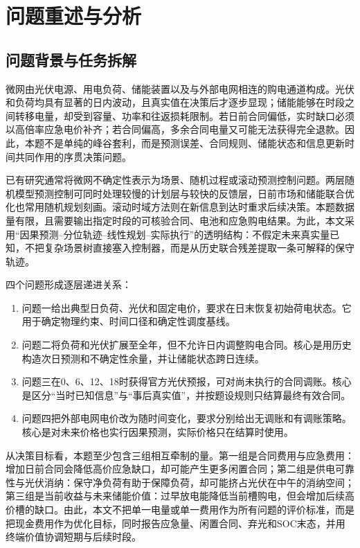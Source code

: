 \section{问题重述与分析}

\subsection{问题背景与任务拆解}

微网由光伏电源、用电负荷、储能装置以及与外部电网相连的购电通道构成。光伏和负荷均具有显著的日内波动，且真实值在决策后才逐步显现；储能能够在时段之间转移电量，却受到容量、功率和往返损耗限制。若日前合同偏低，实时缺口必须以高倍率应急电价补齐；若合同偏高，多余合同电量又可能无法获得完全退款。因此，本题不是单纯的峰谷套利，而是预测误差、合同规则、储能状态和信息更新时间共同作用的序贯决策问题。

已有研究通常将微网不确定性表示为场景、随机过程或滚动预测控制问题\cite{liang2014survey,hu2021mpc}。两层随机模型预测控制可同时处理较慢的计划层与较快的反馈层\cite{raimondi2018twolayer}，日前市场和储能联合优化也常用随机规划刻画\cite{zhao2020dayahead}。滚动时域方法则在新信息到达时重求后续决策\cite{silvente2015rolling}。本题数据量有限，且需要输出指定时段的可核验合同、电池和应急购电结果。为此，本文采用“因果预测--分位轨迹--线性规划--实际执行”的透明结构：不假定未来真实量已知，不把复杂场景树直接塞入控制器，而是从历史联合残差提取一条可解释的保守轨迹。

四个问题形成逐层递进关系：
\begin{enumerate}[label=（\arabic*）]
  \item 问题一给出典型日负荷、光伏和固定电价，要求在日末恢复初始荷电状态。它用于确定物理约束、时间口径和确定性调度基线。
  \item 问题二将负荷和光伏扩展至全年，但不允许日内调整购电合同。核心是用历史构造次日预测和不确定性余量，并让储能状态跨日连续。
  \item 问题三在0、6、12、18时获得官方光伏预报，可对尚未执行的合同调账。核心是区分“当时已知信息”与“事后真实值”，并按题设规则只结算最终有效合同。
  \item 问题四把外部电网电价改为随时间变化，要求分别给出无调账和有调账策略。核心是对未来价格也实行因果预测，实际价格只在结算时使用。
\end{enumerate}

从决策目标看，本题至少包含三组相互牵制的量。第一组是合同费用与应急费用：增加日前合同会降低高价应急缺口，却可能产生更多闲置合同；第二组是供电可靠性与光伏消纳：保守净负荷有助于保障负荷，却可能挤占光伏在中午的消纳空间；第三组是当前收益与未来储能价值：过早放电能降低当前槽购电，但会增加后续高价槽的缺口。由此，本文不把单一电量或单一费用作为所有问题的评价标准，而是把现金费用作为优化目标，同时报告应急量、闲置合同、弃光和SOC末态，并用终端价值协调短期与后续时段。


